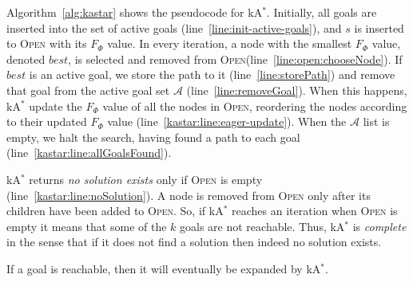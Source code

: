 \documentclass[smallextended]{svjour3}       %
\newcommand{\astar}{A$^*$\xspace}
\newcommand{\kastar}{kA$^*$\xspace}
\newcommand{\open}{\textsc{Open}\xspace}
\newcommand{\activeg}{\mathcal{A}}
\newcommand{\vect}[1]{\mathbf{#1}}
\begin{document}
Algorithm~\ref{alg:kastar} shows the pseudocode for \kastar. 
Initially, all goals are inserted into the set of active goals (line~\ref{line:init-active-goals}), and $s$ is inserted to \open with its $F_\Phi$ value. 
In every iteration, a node with the smallest $F_\Phi$ value, denoted $\mathit{best}$, is selected and removed from \open (line~\ref{line:open:chooseNode}).
If $\mathit{best}$ is an active goal, we store the path to it (line~\ref{line:storePath}) and remove that goal from the active goal set $\activeg$ (line~\ref{line:removeGoal}). 
When this happens, \kastar update the $F_\Phi$ value of all the nodes in \open, reordering the nodes according to their updated $F_\Phi$ value 
 (line~\ref{kastar:line:eager-update}).
When the $\activeg$ list is empty, we halt the search, having found a path to each goal (line~\ref{kastar:line:allGoalsFound}).


\kastar returns \emph{no solution exists} only if \open is empty (line~\ref{kastar:line:noSolution}).
A node is removed from \open only after its children have been added to \open. 
So, if \kastar reaches an iteration when \open is empty it means that some of the $k$ goals are not reachable.
Thus, \kastar is \emph{complete} in the sense that if it does not find a solution then indeed no solution exists.

\begin{proposition}[Completeness]
  \label{prop:completeness}
  If a goal is reachable, then it will eventually be expanded by \kastar. 
\end{proposition}
\end{document}
